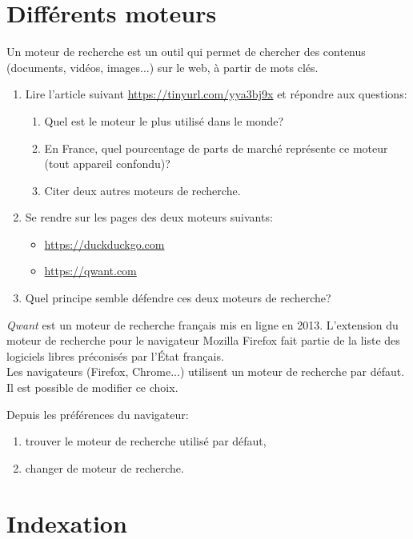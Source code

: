 \documentclass[a4paper,11pt]{article}
\begin{document}
\begin{Form}
\section{Différents moteurs}
\begin{aretenir}[]
Un moteur de recherche est un outil qui permet de chercher  des contenus (documents, vidéos, images...) sur le web, à partir de mots clés.
\end{aretenir}
\begin{activite}
\begin{enumerate}
\item Lire l'article suivant \url{https://tinyurl.com/yya3bj9x} et répondre aux questions:
\begin{enumerate}
\item Quel est le moteur le plus utilisé dans le monde?
\item En France, quel pourcentage de parts de marché représente ce moteur (tout appareil confondu)?
\item Citer deux autres moteurs de recherche.
\end{enumerate}
\item Se rendre sur les pages des deux moteurs suivants:
\begin{itemize}
\item \url{https://duckduckgo.com}
\item \url{https://qwant.com}
\end{itemize}
\item Quel principe semble défendre ces deux moteurs de recherche?
\end{enumerate}
\end{activite}
\emph{Qwant} est un moteur de recherche français mis en ligne en 2013. L'extension du moteur de recherche pour le navigateur Mozilla Firefox fait partie de la liste des logiciels libres préconisés par l'État français.\\
Les navigateurs (Firefox, Chrome...) utilisent un moteur de recherche par défaut. Il est possible de modifier ce choix.
\begin{activite}
Depuis les préférences du navigateur:
\begin{enumerate}
\item trouver le moteur de recherche utilisé par défaut,
\item changer de moteur de recherche.
\end{enumerate}
\end{activite}
\section{Indexation}

\end{Form}
\end{document}
